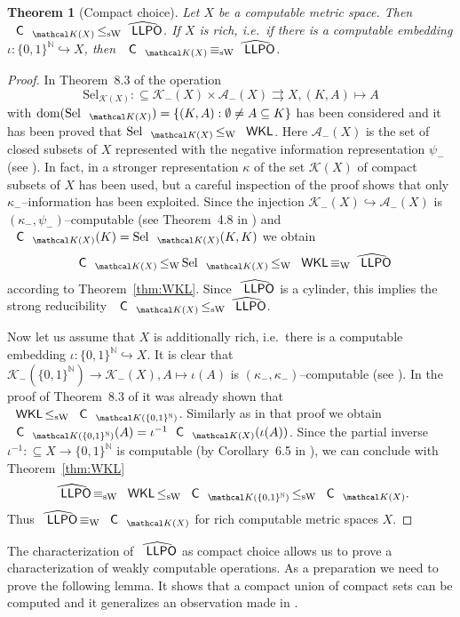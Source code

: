 \documentclass[jsl,10pt]{noasl}
\def\AA{{\mathcal A}}
\def\KK{{\mathcal K}}
\def\IN{{\mathbb{N}}}
\def\In{\subseteq}
\def\into{\hookrightarrow}
\def\mto{\rightrightarrows}
\def\dom{{\rm dom}}
\def\LLPO{\text{\rm\sffamily LLPO}}
\def\WKL{\text{\rm\sffamily WKL}}
\def\C{\text{\rm\sffamily C}}
\def\LLPO{\text{\rm\sffamily LLPO}}
\def\leqW{\mathop{\leq_{\mathrm{W}}}}
\def\equivW{\mathop{\equiv_{\mathrm{W}}}}
\def\leqSW{\mathop{\leq_{\mathrm{sW}}}}
\def\equivSW{\mathop{\equiv_{\mathrm{sW}}}}
\newtheorem{theorem}[proposition]{Theorem}
\begin{document}
\begin{theorem}[Compact choice]
\label{thm:CK}
Let $X$ be a computable metric space. Then $\C_{\KK(X)}\leqSW\widehat{\LLPO}$.
If $X$ is rich, i.e.\ if there is a computable embedding $\iota:\{0,1\}^\IN\into X$,
then $\C_{\KK(X)}\equivSW\widehat{\LLPO}$.
\end{theorem}
\begin{proof}
In Theorem~8.3 of \cite{GM09} the operation 
\[{\mathrm{Sel}}_{\KK(X)}:\In\KK_-(X)\times\AA_-(X)\mto X,(K,A)\mapsto A\]
with $\dom({\mathrm{Sel}}_{\KK(X)})=\{(K,A):\emptyset\not= A\In K\}$
has been considered and it has been proved that ${\mathrm{Sel}}_{\KK(X)}\leqW\WKL$.
Here $\AA_-(X)$ is the set of closed
subsets of $X$ represented with the negative information representation
$\psi_-$ (see \cite{BP03}). 
In fact, in \cite{GM09} a stronger representation $\kappa$
of the set $\KK(X)$ of compact subsets of $X$ has been used, but a careful inspection of the proof shows
that only $\kappa_-$--information has been exploited. 
Since the injection
$\KK_-(X)\into\AA_-(X)$ is $(\kappa_-,\psi_-)$--computable (see Theorem~4.8 in \cite{BP03})
and $\C_{\KK(X)}(K)={\mathrm{Sel}}_{\KK(X)}(K,K)$ we obtain
\[\C_{\KK(X)}\leqW{\mathrm{Sel}}_{\KK(X)}\leqW\WKL\equivW\widehat{\LLPO}\]
according to Theorem~\ref{thm:WKL}. Since $\widehat{\LLPO}$ is a cylinder,
this implies the strong reducibility $\C_{\KK(X)}\leqSW\widehat{\LLPO}$.

Now let us assume that $X$ is additionally rich, i.e.\ 
there is a computable embedding $\iota:\{0,1\}^\IN\into X$.
It is clear that $\KK_-(\{0,1\}^\IN)\to\KK_-(X),A\mapsto\iota(A)$ is $(\kappa_-,\kappa_-)$--computable
(see \cite{Wei03}). 
In the proof of Theorem~8.3 of \cite{GM09} it was already shown that $\WKL\leqSW\C_{\KK(\{0,1\}^\IN)}$.
Similarly as in that proof we obtain $\C_{\KK(\{0,1\}^\IN)}(A)=\iota^{-1}\C_{\KK(X)}(\iota(A))$.
Since the partial inverse $\iota^{-1}:\In X\to\{0,1\}^\IN$ is computable (by Corollary~6.5 in \cite{Bra08}),
we can conclude with Theorem~\ref{thm:WKL}
\[\widehat{\LLPO}\equivSW\WKL\leqSW\C_{\KK(\{0,1\}^\IN)}\leqSW\C_{\KK(X)}.\]
Thus $\widehat{\LLPO}\equivW\C_{\KK(X)}$ for rich computable metric spaces $X$.
\end{proof}

The characterization of $\widehat{\LLPO}$ as compact choice allows us to prove
a characterization of weakly computable operations. As a preparation we need
to prove the following lemma. It shows that a compact union of compact sets
can be computed and it generalizes an observation made in \cite{Bra01a}.
\end{document}
